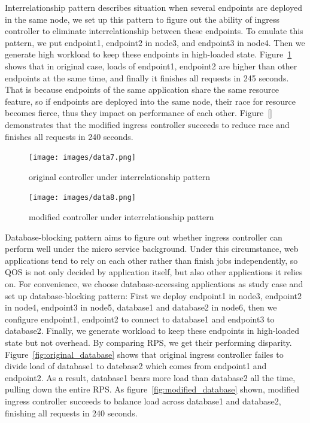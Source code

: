 Interrelationship pattern describes situation when several endpoints are deployed in the same node, we set up this pattern to figure out the ability of ingress controller to eliminate interrelationship between these endpoints. To emulate this pattern, we put endpoint1, endpoint2 in node3, and endpoint3  in node4. Then we generate high workload to keep these endpoints in high-loaded state. Figure~{\ref{fig:original_interrelationship}} shows that in original case, loads of endpoint1, endpoint2 are higher than other endpoints at the same time, and finally it finishes all requests in 245 seconds. That is because endpoints of the same application share the same resource feature, so if endpoints are deployed into the same node, their race for resource becomes fierce, thus they impact on performance of each other. Figure~{\ref{}} demonstrates that the modified ingress controller succeeds to reduce race and finishes all requests in 240 seconds.

\begin{figure}[!htb]
 \centering
 \texttt{[image: images/data7.png]}\\
 \caption{original controller under interrelationship pattern}
 \label{fig:original_interrelationship}
\end{figure}

\begin{figure}[!htb]
 \centering
 \texttt{[image: images/data8.png]}\\
 \caption{modified controller under interrelationship pattern}
 \label{fig:modified_interrelationship}
\end{figure}

Database-blocking pattern aims to figure out whether ingress controller can perform well under the micro service background. Under this circumstance, web applications tend to rely on each other rather than finish jobs independently, so QOS is not only decided by application itself, but also other applications it relies on. For convenience, we choose database-accessing applications as study case and set up database-blocking pattern: First we deploy endpoint1 in node3, endpoint2 in node4, endpoint3 in node5, database1 and database2 in node6, then we configure endpoint1, endpoint2 to connect to database1 and endpoint3 to database2. Finally, we generate workload to keep these endpoints in high-loaded state but not overhead. By comparing RPS, we get their performing disparity. Figure~{\ref{fig:original_database}} shows that original ingress controller failes to divide load of database1 to datebase2 which comes from endpoint1 and endpoint2. As a result, database1 bears more load than database2 all the time, pulling down the entire RPS. As figure~{\ref{fig:modified_database}} shown, modified ingress controller succeeds to balance load across database1 and database2, finishing all requests in 240 seconds.

